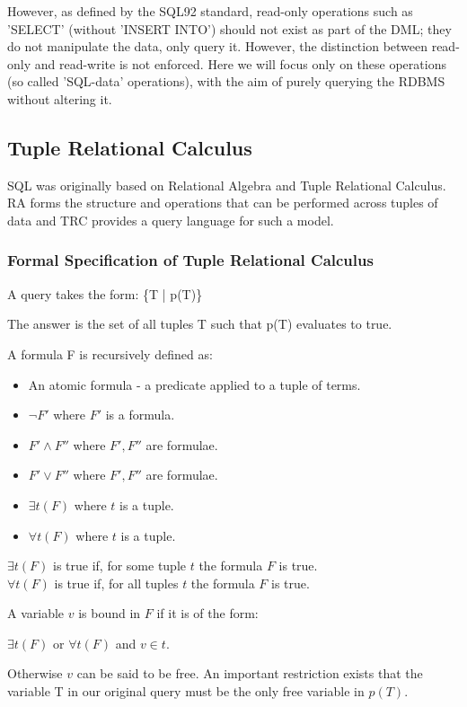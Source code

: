 \documentclass[a4wide, 11pt]{article}
\begin{document}
However, as defined by the SQL92 standard\cite{isoSQL}, read-only operations such as
'SELECT' (without 'INSERT INTO') should not exist as part of the DML; they do
not manipulate the data, only query it. However, the distinction between
read-only and read-write is not enforced. Here we will focus only on these
operations (so called 'SQL-data' operations), with the aim of purely querying
the RDBMS without altering it.

\subsection{Tuple Relational Calculus}

SQL was originally based on Relational Algebra and Tuple Relational Calculus.
RA forms the structure and operations that can be performed
across tuples of data and TRC provides a query language for such a model.

\subsubsection{Formal Specification of Tuple Relational Calculus\cite{lecRA}}

A query takes the form: \{T | p(T)\}

The answer is the set of all tuples T such that p(T) evaluates to
true.

A formula F is recursively defined as:
\begin{itemize}
\item  An atomic formula - a predicate applied to a tuple of terms.
\item  $\lnot F'$ where $F'$ is a formula.
\item  $F' \land F''$ where $F', F''$ are formulae.
\item  $F' \lor F''$ where $F', F''$ are formulae.
\item  $\exists t(F)$ where $t$ is a tuple.
\item  $\forall t(F)$ where $t$ is a tuple.
\end{itemize}

$\exists t(F)$ is true if, for some tuple $t$ the formula $F$ is true.\\
$\forall t(F)$ is true if, for all tuples $t$ the formula $F$ is true.

A variable $v$ is bound in $F$ if it is of the form:

$\exists t(F)$ or $\forall t(F)$ and $v \in t$.

Otherwise $v$ can be said to be free. An important restriction exists that the
variable T in our original query must be the only free variable in $p(T)$.
\end{document}
